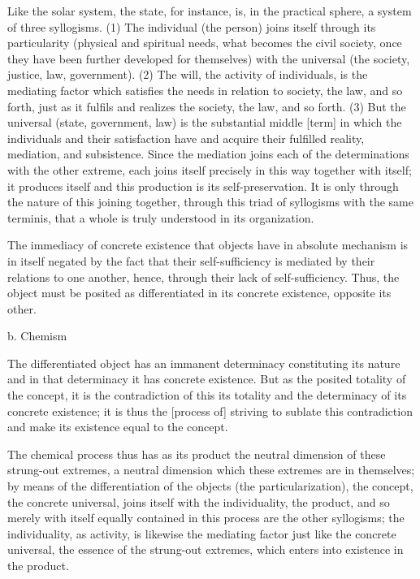 Like the solar system, the state, for instance, is,
in the practical sphere, a system of three syllogisms.
(1) The individual (the person) joins itself through its particularity
(physical and spiritual needs, what becomes the civil society,
once they have been further developed for themselves)
with the universal (the society, justice, law, government).
(2) The will, the activity of individuals, is the mediating factor
which satisfies the needs in relation to society, the law, and so forth,
just as it fulfils and realizes the society, the law, and so forth.
(3) But the universal (state, government, law)
is the substantial middle [term]
in which the individuals and their satisfaction
have and acquire their fulfilled reality, mediation, and subsistence.
Since the mediation joins each of the determinations with the other extreme,
each joins itself precisely in this way together with itself;
it produces itself and this production is its self-preservation.
It is only through the nature of this joining together,
through this triad of syllogisms with the same terminis,
that a whole is truly understood in its organization.

The immediacy of concrete existence
that objects have in absolute mechanism
is in itself negated by the fact that
their self-sufficiency is mediated by
their relations to one another, hence,
through their lack of self-sufficiency.
Thus, the object must be posited as
differentiated in its concrete existence,
opposite its other.

b. Chemism

The differentiated object has an immanent determinacy
constituting its nature and in that determinacy
it has concrete existence.
But as the posited totality of the concept,
it is the contradiction of this its totality
and the determinacy of its concrete existence;
it is thus the [process of] striving to sublate this contradiction
and make its existence equal to the concept.

The chemical process thus has as its product
the neutral dimension of these strung-out extremes,
a neutral dimension which these extremes are in themselves;
by means of the differentiation of the objects (the particularization),
the concept, the concrete universal, joins itself
with the individuality, the product,
and so merely with itself equally contained
in this process are the other syllogisms;
the individuality, as activity, is likewise
the mediating factor just like the concrete universal,
the essence of the strung-out extremes,
which enters into existence in the product.

